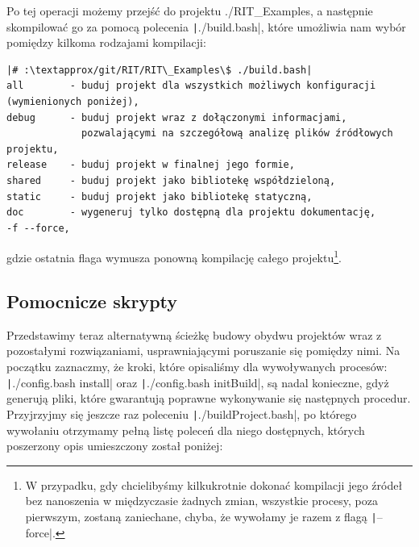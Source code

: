 Po tej operacji możemy przejść do projektu \textsf{./RIT\_Examples}, a następnie skompilować go za pomocą polecenia \texttt|./build.bash|, które umożliwia nam wybór pomiędzy kilkoma rodzajami kompilacji:

\begin{verbatim}
|# :\textapprox/git/RIT/RIT\_Examples\$ ./build.bash|
all        - buduj projekt dla wszystkich możliwych konfiguracji (wymienionych poniżej),
debug      - buduj projekt wraz z dołączonymi informacjami,
             pozwalającymi na szczegółową analizę plików źródłowych projektu,
release    - buduj projekt w finalnej jego formie,
shared     - buduj projekt jako bibliotekę współdzieloną,
static     - buduj projekt jako bibliotekę statyczną,
doc        - wygeneruj tylko dostępną dla projektu dokumentację,
-f --force,
\end{verbatim}
gdzie ostatnia flaga wymusza ponowną kompilację całego projektu\footnote{W przypadku, gdy chcielibyśmy kilkukrotnie dokonać kompilacji jego źródeł bez nanoszenia w międzyczasie żadnych zmian, wszystkie procesy, poza pierwszym, zostaną zaniechane, chyba, że wywołamy je razem z flagą \texttt|--force|.}. 

\subsection{Pomocnicze skrypty}

Przedstawimy teraz alternatywną ścieżkę budowy obydwu projektów wraz z pozostałymi rozwiązaniami, usprawniającymi poruszanie się pomiędzy nimi. Na początku zaznaczmy, że kroki, które opisaliśmy dla wywoływanych procesów: \texttt|./config.bash install| oraz \texttt|./config.bash initBuild|, są nadal konieczne, gdyż generują pliki, które gwarantują poprawne wykonywanie się następnych procedur. Przyjrzyjmy się jeszcze raz poleceniu \texttt|./buildProject.bash|, po którego wywołaniu otrzymamy pełną listę poleceń dla niego dostępnych, których poszerzony opis umieszczony został poniżej:

